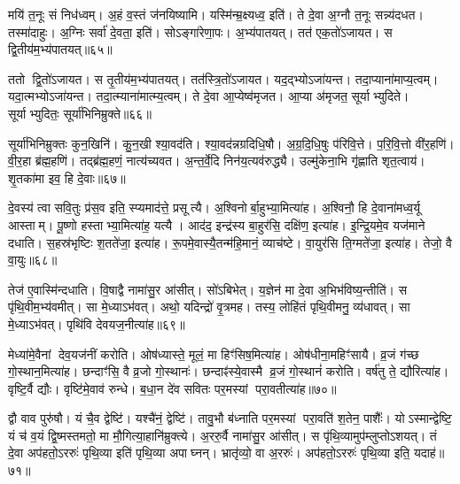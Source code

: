 मयि॑ त॒नूः सं निध॑ध्वम्।
अ॒हं व॒स्तं ज॑नयिष्यामि।
यस्मि॑न्म्र॒क्ष्यध्व॒ इति॑।
ते दे॒वा अ॒ग्नौ त॒नूः सन्न्य॑दधत।
तस्मा॑दाहुः।
अ॒ग्निः सर्वा॑ दे॒वता॒ इति॑।
सोऽङ्गा॑रेणा॒पः।
अ॒भ्य॑पातयत्।
तत॑ एक॒तो॑\-ऽजायत।
स द्वि॒तीय॑म॒भ्य॑पातयत्॥६५॥

ततो द्वि॒तो॑\-ऽजायत।
स तृ॒तीय॑म॒भ्य॑पातयत्।
तत॑स्त्रि॒तो॑\-ऽजायत।
यद॒द्भ्यो\-ऽजा॑यन्त।
तदा॒प्याना॑माप्य॒त्वम्।
यदा॒त्मभ्यो\-ऽजा॑यन्त।
तदा॒त्म्याना॑मात्म्य॒त्वम्।
ते दे॒वा आ॒प्येष्व॑मृजत।
आ॒प्या अ॑मृजत॒ सूर्याभ्युदिते।
सूर्याभ्युदितः॒ सूर्या॑भिनिम्रुक्ते॥६६॥

सूर्या॑भिनिम्रुक्तः कुन॒खिनि॑।
कु॒न॒खी श्या॒वद॑ति।
श्या॒वद॑न्नग्रदिधि॒षौ।
अ॒ग्र॒दि॒धि॒षुः प॑रिवि॒त्ते।
प॒रि॒वि॒त्तो वी॑र॒हणि॑।
वी॒र॒हा ब्र॑ह्म॒हणि॑।
तद्ब्र॑ह्म॒हणं॒ नात्य॑च्यवत।
अ॒न्त॒र्वे॒दि निन॑य॒त्यव॑रुद्ध्यै।
उल्मु॑केना॒भि गृ॑ह्णाति शृत॒त्वाय॑।
शृ॒तका॑मा इव॒ हि दे॒वाः॥६७॥\anuvakamend[अ॒न्या जि॑न्वन्त्यनु वि॒सृत्यै॒वमा॒हाशान्त आह॒ गुप्त्यै॑ छ॒न्नं ब्रह्माब्रवीद्द्वि॒तीय॑म॒भ्य॑पातय॒थ्सूर्या॑भिनिम्रुक्ते दे॒वाः]

दे॒वस्य॑ त्वा सवि॒तुः प्र॑स॒व इति॒ स्प्यमाद॑त्ते॒ प्रसूत्यै।
अ॒श्विनोर्बा॒हुभ्या॒मित्या॑ह।
अ॒श्विनौ॒ हि दे॒वाना॑मध्व॒र्यू आस्ताम्।
पू॒ष्णो हस्ताभ्या॒मित्या॑ह॒ यत्यै।
आद॑द॒ इन्द्र॑स्य बा॒हुर॑सि॒ दक्षि॑ण॒ इत्या॑ह।
इ॒न्द्रि॒यमे॒व यज॑माने दधाति।
स॒हस्र॑भृष्टिः श॒तते॑जा॒ इत्या॑ह।
रू॒पमे॒वास्यै॒तन्म॑हि॒मानं॒ व्याच॑ष्टे।
वा॒युर॑सि ति॒ग्मते॑जा॒ इत्या॑ह।
तेजो॒ वै वा॒युः॥६८॥

तेज॑ ए॒वास्मि॑न्दधाति।
वि॒षाद्वै नामा॑सु॒र आ॑सीत्।
सो॑ऽबिभेत्।
य॒ज्ञेन॑ मा दे॒वा अ॒भिभ॑विष्य॒न्तीति॑।
स पृ॑थि॒वीम॒भ्य॑वमीत्।
सा मे॒ध्या\-ऽभ॑वत्।
अथो॒ यदिन्द्रो॑ वृ॒त्रमह\sn{}।
तस्य॒ लोहि॑तं पृथि॒वीमनु॒ व्य॑धावत्।
सा मे॒ध्या\-ऽभ॑वत्।
पृथि॑वि देवयज॒नीत्या॑ह॥६९॥

मेध्या॑मे॒वैनां देव॒यज॑नीं करोति।
ओष॑ध्यास्ते॒ मूलं॒ मा हिꣳ॑सिष॒मित्या॑ह।
ओष॑धीना॒महिꣳ॑सायै।
व्र॒जं ग॑च्छ गो॒स्थान॒मित्या॑ह।
छन्दाꣳ॑सि॒ वै व्र॒जो गो॒स्थानः॑।
छन्दाꣴ॑स्ये॒वास्मै व्र॒जं गो॒स्थानं॑ करोति।
वर्\mbox{}ष॑तु ते॒ द्यौरित्या॑ह।
वृष्टि॒र्वै द्यौः।
वृष्टि॑मे॒वाव॑ रुन्धे।
ब॒धा॒न दे॑व सवितः पर॒मस्यां परा॒वतीत्या॑ह॥७०॥

द्वौ वाव पुरु॑षौ।
यं चै॒व द्वेष्टि॑।
यश्चै॑नं॒ द्वेष्टि॑।
तावु॒भौ ब॑ध्नाति पर॒मस्यां परा॒वति॑ श॒तेन॒ पाशैः᳚।
योऽस्मान्द्वेष्टि॒ यं च॑ व॒यं द्वि॒ष्मस्तमतो॒ मा मौ॒गित्या॒हानि॑म्रुक्त्ये।
अ॒ररु॒र्वै नामा॑सु॒र आ॑सीत्।
स पृ॑थि॒व्यामुप॑म्लुप्तो\-ऽशयत्।
तं दे॒वा अप॑हतो॒\-ऽररुः॑ पृथि॒व्या इति॑ पृथि॒व्या अपाघ्नन्।
भ्रातृ॑व्यो॒ वा अ॒ररुः॑।
अप॑हतो॒\-ऽररुः॑ पृथि॒व्या इति॒ यदाह॑॥७१॥

